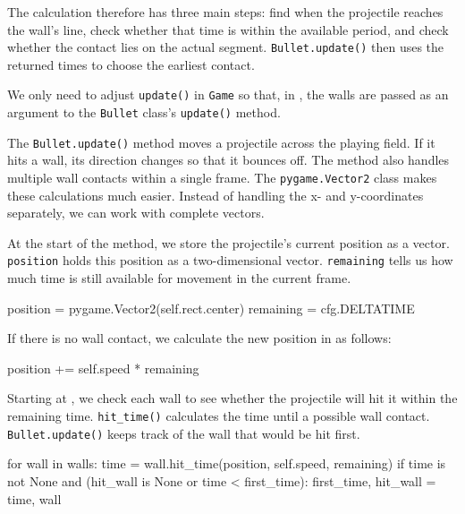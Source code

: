 The calculation therefore has three main steps: find when the projectile reaches the wall's line, check whether that time is within the available period, and check whether the contact lies on the actual segment. \texttt{Bullet.update()} then uses the returned times to choose the earliest contact.


We only need to adjust \texttt{update()} in \texttt{Game} so that, in , the walls are passed as an argument to the \texttt{Bullet} class's \texttt{update()} method.


The \texttt{Bullet.update()} method moves a projectile across the playing field. If it hits a wall, its direction changes so that it bounces off. The method also handles multiple wall contacts within a single frame.
The \texttt{pygame.Vector2} class makes these calculations much easier. Instead of handling the x- and y-coordinates separately, we can work with complete vectors.

At the start of the method, we store the projectile's current position as a vector. \texttt{position} holds this position as a two-dimensional vector. \texttt{remaining} tells us how much time is still available for movement in the current frame.
\begin{codebox}
position = pygame.Vector2(self.rect.center)
remaining = cfg.DELTATIME
\end{codebox}

If there is no wall contact, we calculate the new position in  as follows:
\begin{codebox}
	position += self.speed * remaining
\end{codebox}

Starting at , we check each wall to see whether the projectile will hit it within the remaining time. \texttt{hit\_time()} calculates the time until a possible wall contact. \texttt{Bullet.update()} keeps track of the wall that would be hit first.
\begin{codebox}
for wall in walls:
    time = wall.hit_time(position, self.speed, remaining)
    if time is not None and (hit_wall is None or time < first_time):
        first_time, hit_wall = time, wall
\end{codebox}

